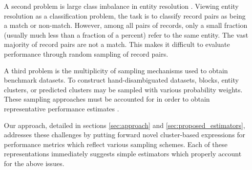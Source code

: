 \documentclass[fontsize=11pt]{article}
\theoremstyle{definition}
\begin{document}
A second problem is large class imbalance in entity resolution \citep{Marchant2017}. {Viewing entity resolution as a classification problem, the task is to classify record pairs as being a match or non-match. However,} among all pairs of records, only a small fraction (usually much less than a fraction of a percent) refer to the same entity. The vast majority of record pairs are not a match. This makes it difficult to evaluate performance through random sampling of record pairs.

A third problem is the multiplicity of sampling mechanisms used to obtain benchmark datasets. To construct hand-disambiguated datasets, blocks, entity clusters, or predicted clusters may be sampled with various probability weights. These sampling approaches must be accounted for in order to obtain representative performance estimates \citep{fuller2011sampling}.

Our approach, detailed in sections \ref{sec:approach} and \ref{sec:proposed_estimators}, addresses these challenges by putting forward novel cluster-based expressions for performance metrics which reflect various sampling schemes. Each of these representations immediately suggests simple estimators which properly account for the above issues.
\end{document}
